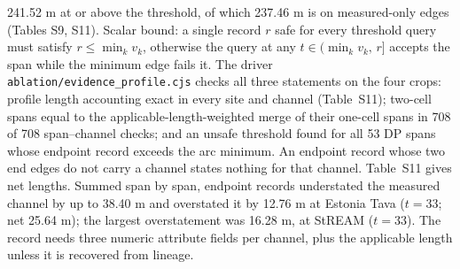 \documentclass[11pt]{article}
\begin{document}
241.52 m at or above the threshold, of which 237.46 m is on measured-only edges (Tables S9, S11). Scalar bound: a single record $r$ safe for every threshold query must satisfy $r\le\min_k v_k$, otherwise the query at any $t\in(\min_k v_k,\,r]$ accepts the span while the minimum edge fails it. The driver \texttt{ablation/evidence\_profile.cjs} checks all three statements on the four crops: profile length accounting exact in every site and channel (Table~S11); two-cell spans equal to the applicable-length-weighted merge of their one-cell spans in 708 of 708 span--channel checks; and an unsafe threshold found for all 53 DP spans whose endpoint record exceeds the arc minimum. An endpoint record whose two end edges do not carry a channel states nothing for that channel. Table~S11 gives net lengths. Summed span by span, endpoint records understated the measured channel by up to 38.40 m and overstated it by 12.76 m at Estonia Tava ($t=33$; net 25.64 m); the largest overstatement was 16.28 m, at StREAM ($t=33$). The record needs three numeric attribute fields per channel, plus the applicable length unless it is recovered from lineage.
\end{document}
